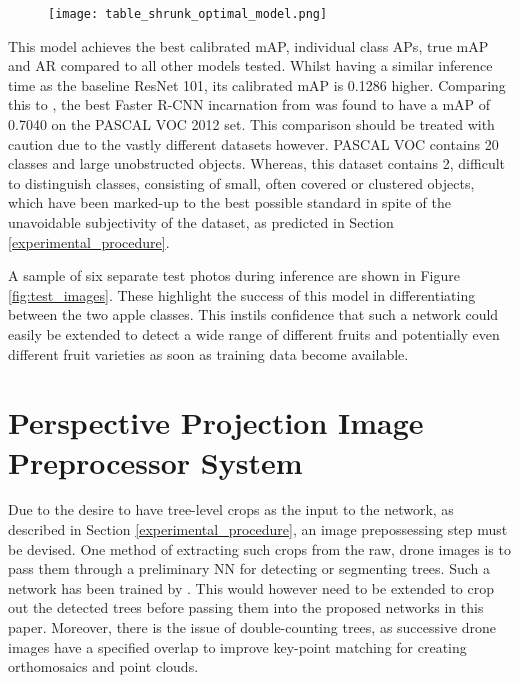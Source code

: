 \documentclass[journal]{IEEEtran}
\begin{document}
\begin{figure}[H]
    \centering
    \texttt{[image: table\_shrunk\_optimal\_model.png]}
    \label{fig:table_shrunk}
\end{figure}




This model achieves the best calibrated mAP, individual class APs, true mAP and AR compared to all other models tested. Whilst having a similar inference time as the baseline ResNet 101, its calibrated mAP is 0.1286 higher. Comparing this to \cite{fasterrcnn}, the best Faster R-CNN incarnation from  was found to have a mAP of 0.7040 on the PASCAL VOC 2012 set. This comparison should be treated with caution due to the vastly different datasets however. PASCAL VOC contains 20 classes and large unobstructed objects. Whereas, this dataset contains 2, difficult to distinguish classes, consisting of small, often covered or clustered objects, which have been marked-up to the best possible standard in spite of the unavoidable subjectivity of the dataset, as predicted in Section \ref{experimental_procedure}.

A sample of six separate test photos during inference are shown in Figure \ref{fig:test_images}. These highlight the success of this model in differentiating between the two apple classes. This instils confidence that such a network could easily be extended to detect a wide range of different fruits and potentially even different fruit varieties as soon as training data become available.





















\section{Perspective Projection Image Preprocessor System}\label{sec:deployment} 



Due to the desire to have tree-level crops as the input to the network, as described in Section \ref{experimental_procedure}, an image prepossessing step must be devised. One method of extracting such crops from the raw, drone images is to pass them through a preliminary NN for detecting or segmenting trees. Such a network has been trained by \cite{hawthorne}. This would however need to be extended to crop out the detected trees before passing them into the proposed networks in this paper. Moreover, there is the issue of double-counting trees, as successive drone images have a specified overlap to improve key-point matching for creating orthomosaics and point clouds. 
\end{document}
